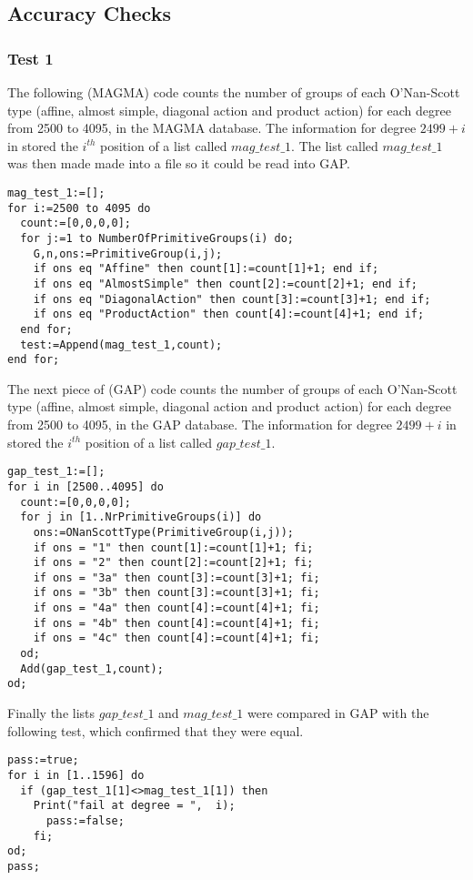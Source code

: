 \documentclass[]{article}
\theoremstyle{definition}
\begin{document}
\subsection{Accuracy Checks}
\subsubsection{Test 1}

The following (MAGMA) code counts the number of groups of each O'Nan-Scott type (affine, almost simple, diagonal action and product action) for each degree from 2500 to 4095, in the MAGMA database. The information for degree $2499+i$ in stored the $i^{th}$ position of a list called $mag\_test\_1$. The list called $mag\_test\_1$ was then made made into a file so it could be read into GAP.
\begin{verbatim}
mag_test_1:=[];
for i:=2500 to 4095 do
  count:=[0,0,0,0];
  for j:=1 to NumberOfPrimitiveGroups(i) do;
    G,n,ons:=PrimitiveGroup(i,j);
    if ons eq "Affine" then count[1]:=count[1]+1; end if;
    if ons eq "AlmostSimple" then count[2]:=count[2]+1; end if;
    if ons eq "DiagonalAction" then count[3]:=count[3]+1; end if;
    if ons eq "ProductAction" then count[4]:=count[4]+1; end if;
  end for;
  test:=Append(mag_test_1,count);
end for;
\end{verbatim}

The next piece of (GAP) code counts the number of groups of each O'Nan-Scott type (affine, almost simple, diagonal action and product action) for each degree from 2500 to 4095, in the GAP database. The information for degree $2499+i$ in stored the $i^{th}$ position of a list called $gap\_test\_1$.
\begin{verbatim}
gap_test_1:=[];
for i in [2500..4095] do
  count:=[0,0,0,0];
  for j in [1..NrPrimitiveGroups(i)] do
    ons:=ONanScottType(PrimitiveGroup(i,j));
    if ons = "1" then count[1]:=count[1]+1; fi;
    if ons = "2" then count[2]:=count[2]+1; fi;
    if ons = "3a" then count[3]:=count[3]+1; fi;
    if ons = "3b" then count[3]:=count[3]+1; fi;
    if ons = "4a" then count[4]:=count[4]+1; fi;
    if ons = "4b" then count[4]:=count[4]+1; fi;
    if ons = "4c" then count[4]:=count[4]+1; fi;
  od;
  Add(gap_test_1,count);
od;
\end{verbatim}

Finally the lists $gap\_test\_1$ and $mag\_test\_1$ were compared in GAP with the following test, which confirmed that they were equal.
\begin{verbatim}
pass:=true;
for i in [1..1596] do
  if (gap_test_1[1]<>mag_test_1[1]) then 
    Print("fail at degree = ", 	i); 
      pass:=false; 
    fi;
od;
pass;
\end{verbatim}
\end{document}
